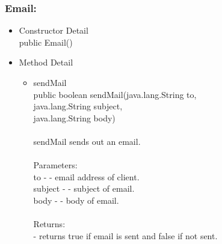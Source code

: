 \documentclass[letterpaper]{article}
\begin{document}
								\subsubsection*{Email:}
								\vspace{0.1in}	
									\begin{itemize}
										\item	Constructor Detail \\
												public Email()
										\item	Method Detail
												\begin{itemize}
													\item	sendMail \\
															public boolean sendMail(java.lang.String to, \\
						               java.lang.String subject, \\
						               java.lang.String body) \\ \\
															sendMail sends out an email. \\ \\
															Parameters: \\
															to - - email address of client.	\\
															subject - - subject of email. \\
															body - - body of email. \\ \\
															Returns: \\
															- returns true if email is sent and false if not sent.
												\end{itemize}
									\end{itemize}
									
									\vspace{0.2in}
\end{document}
